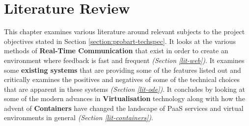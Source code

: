 
\chapter{Literature Review} \label{lit}

This chapter examines various literature around relevant subjects to the project objectives stated in Section \ref{section:probart-techspec}. It looks at the various methods of \textbf{Real-Time Communication} that exist in order to create an environment where feedback is fast and frequent \textit{(Section \ref{lit-web})}. It examines some \textbf{existing systems} that are providing some of the features listed out and critically examines the positives and negatives of some of the technical choices that are apparent in these systems \textit{(Section \ref{lit-ode})}. It concludes by looking at some of the modern advances in \textbf{Virtualisation} technology along with how the advent of \textbf{Containers} have changed the landscape of PaaS services and virtual environments in general \textit{(Section \ref{lit-containers})}.



